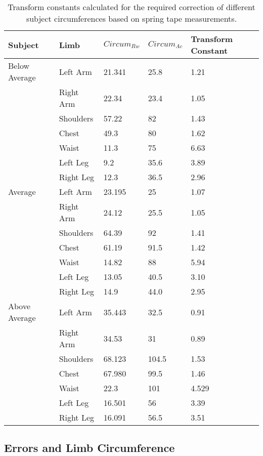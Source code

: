 \begin{table}[!htb]
\begin{center}
\begin{tabular}{| l | l | l | l | l |}
\hline
Subject & Limb & $Circum_{Rw}$ & $Circum_{Ac}$ & Transform Constant \\ \hline
    Below Average & Left Arm & 21.341 & 25.8 & 1.21 \\ \hline
    & Right Arm & 22.34 & 23.4 & 1.05\\ \hline
    & Shoulders & 57.22 & 82 & 1.43\\ \hline
    & Chest & 49.3 & 80 & 1.62\\ \hline
    & Waist & 11.3 & 75 & 6.63\\ \hline
    & Left Leg & 9.2 & 35.6 & 3.89\\ \hline
    & Right Leg & 12.3 & 36.5 & 2.96\\ \hline \hline
    Average & Left Arm & 23.195 & 25 & 1.07 \\ \hline
    & Right Arm & 24.12 & 25.5 & 1.05 \\ \hline
    & Shoulders & 64.39 & 92 & 1.41\\ \hline
    & Chest & 61.19 & 91.5 & 1.42\\ \hline
    & Waist & 14.82 & 88 & 5.94\\ \hline
    & Left Leg & 13.05 & 40.5 & 3.10\\ \hline
    & Right Leg & 14.9 & 44.0 & 2.95\\ \hline \hline
    Above Average & Left Arm & 35.443 & 32.5 & 0.91\\ \hline
    & Right Arm & 34.53 & 31 & 0.89\\ \hline
    & Shoulders & 68.123 & 104.5 & 1.53\\ \hline
    & Chest & 67.980 & 99.5 & 1.46\\ \hline
    & Waist & 22.3 & 101 & 4.529\\ \hline
    & Left Leg & 16.501 & 56 & 3.39\\ \hline
    & Right Leg & 16.091 & 56.5 & 3.51 \\ \hline \hline
\end{tabular}
\end{center}
\caption{Transform constants calculated for the required correction of different subject circumferences based on spring tape measurements.}
\label{testing: transform constants}
\end{table}

\subsection{Errors and Limb Circumference}

